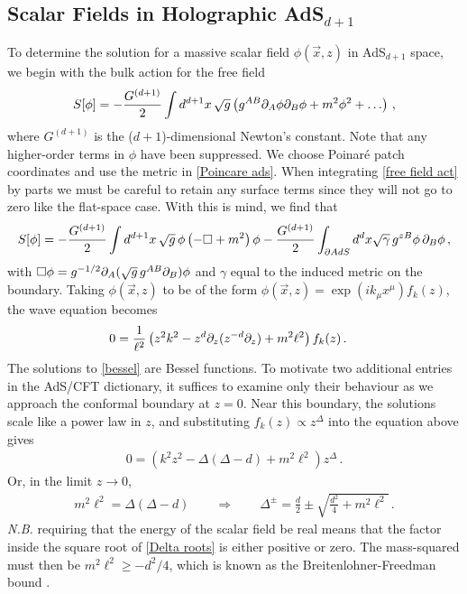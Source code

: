 \documentclass[../PhD.tex]{subfiles}
\begin{document}

\subsection{Scalar Fields in Holographic AdS$_{d+1}$}
\label{ssec: scalar fields}

To determine the solution for a massive scalar field $\phi(\vec x, z)$ in AdS$_{d+1}$ space, we begin with the bulk action for the free field
\begin{align}
\label{free field act}
S[\phi] = -\frac{G^{(d+1)}}{2} \int d^{d+1} x \, \sqrt{g} \left( g^{AB} \partial_A \phi \partial_B \phi + m^2 \phi^2 + \ldots \right) \, ,
\end{align}
where $G^{(d+1)}$ is the ($d+1$)-dimensional Newton's constant. Note that any higher-order terms in $\phi$ have been suppressed. We choose Poinar\'e patch coordinates and use the metric in \eqref{Poincare ads}. When integrating \eqref{free field act} by parts we must be careful to retain any surface terms since they will not go to zero like the flat-space case. With this is mind, we find that
\begin{align}
\label{action int by parts}
S[\phi] = -\frac{G^{(d+1)}}{2} \int d^{d+1}x \, \sqrt{g}\, \phi \left( - \Box + m^2 \right) \phi - \frac{G^{(d+1)}}{2}\int_{\partial AdS} d^d x \sqrt{\gamma} \, g^{zB} \phi \, \partial_B \phi \, ,
\end{align}
with $\Box \phi = g^{-1/2} \partial_A (\sqrt{g} \, g^{AB} \partial_B) \phi$ and $\gamma$ equal to the induced metric on the boundary. Taking $\phi(\vec x, z)$ to be of the form $\phi(\vec x, z) = \exp( i k_\mu x^\mu) f_k (z)$, the wave equation becomes
\begin{align}
\label{bessel}
0 &= \frac{1}{\ell^2} \left( z^2 k^2 - z^{d} \partial_z (z^{-d} \partial_z ) + m^2 \ell^2 \right) f_k(z) \, .
\end{align}
The solutions to \eqref{bessel} are Bessel functions. To motivate two additional entries in the AdS/CFT dictionary, it suffices to examine only their behaviour as we approach the conformal boundary at $z = 0$. Near this boundary, the solutions scale like a power law in $z$, and substituting $f_k(z) \propto z^{\Delta}$ into the equation above gives
\begin{align}
0 = \left(k^2 z^2 - \Delta(\Delta - d) + m^2 \ell^2 \right) z^\Delta \, .
\end{align}
Or, in the limit $z \to 0$,
\begin{align}
\label{Delta roots}
m^2 \ell^2 = \Delta (\Delta - d) \qquad \Rightarrow \qquad \Delta^{\pm} = \frac{d}{2} \pm \sqrt{\frac{d^2}{4} + m^2\ell^2} \, .
\end{align}
{\it N.B.} requiring that the energy of the scalar field be real means that the factor inside the square root of \eqref{Delta roots} is either positive or zero. The mass-squared must then be $m^2 \ell^2 \geq - d^2 /4$, which is known as the Breitenlohner-Freedman bound \cite{Breitenlohner:1982bm}. 
\end{document}

